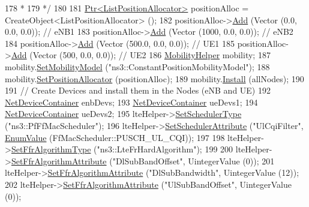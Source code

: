\begin{DoxyCode}
178 \textcolor{comment}{   *}
179 \textcolor{comment}{   */}
180 
181   \hyperlink{classns3_1_1Ptr}{Ptr<ListPositionAllocator>} positionAlloc = CreateObject<ListPositionAllocator> 
      ();
182   positionAlloc->\hyperlink{classns3_1_1ListPositionAllocator_a460e82f015ac012a73ba0ea0cccb3486}{Add} (Vector (0.0, 0.0, 0.0));   \textcolor{comment}{// eNB1}
183   positionAlloc->\hyperlink{classns3_1_1ListPositionAllocator_a460e82f015ac012a73ba0ea0cccb3486}{Add} (Vector (1000, 0.0, 0.0)); \textcolor{comment}{// eNB2}
184   positionAlloc->\hyperlink{classns3_1_1ListPositionAllocator_a460e82f015ac012a73ba0ea0cccb3486}{Add} (Vector (500.0, 0.0, 0.0));  \textcolor{comment}{// UE1}
185   positionAlloc->\hyperlink{classns3_1_1ListPositionAllocator_a460e82f015ac012a73ba0ea0cccb3486}{Add} (Vector (500, 0.0, 0.0));  \textcolor{comment}{// UE2}
186   \hyperlink{classns3_1_1MobilityHelper}{MobilityHelper} mobility;
187   mobility.\hyperlink{classns3_1_1MobilityHelper_a030275011b6f40682e70534d30280aba}{SetMobilityModel} (\textcolor{stringliteral}{"ns3::ConstantPositionMobilityModel"});
188   mobility.\hyperlink{classns3_1_1MobilityHelper_ac59d5295076be3cc11021566713a28c5}{SetPositionAllocator} (positionAlloc);
189   mobility.\hyperlink{classns3_1_1MobilityHelper_a07737960ee95c0777109cf2994dd97ae}{Install} (allNodes);
190 
191   \textcolor{comment}{// Create Devices and install them in the Nodes (eNB and UE)}
192   \hyperlink{classns3_1_1NetDeviceContainer}{NetDeviceContainer} enbDevs;
193   \hyperlink{classns3_1_1NetDeviceContainer}{NetDeviceContainer} ueDevs1;
194   \hyperlink{classns3_1_1NetDeviceContainer}{NetDeviceContainer} ueDevs2;
195   lteHelper->\hyperlink{classns3_1_1LteHelper_a8f86e55b8b80a81732c4b2df00fb25d5}{SetSchedulerType} (\textcolor{stringliteral}{"ns3::PfFfMacScheduler"});
196   lteHelper->\hyperlink{classns3_1_1LteHelper_a38f8c7f4592b31c0f3dedb53e7909742}{SetSchedulerAttribute} (\textcolor{stringliteral}{"UlCqiFilter"}, 
      \hyperlink{classns3_1_1EnumValue}{EnumValue} (FfMacScheduler::PUSCH\_UL\_CQI));
197 
198   lteHelper->\hyperlink{classns3_1_1LteHelper_a035c6b03305c1511975362f80425b5fc}{SetFfrAlgorithmType} (\textcolor{stringliteral}{"ns3::LteFrHardAlgorithm"});
199 
200   lteHelper->\hyperlink{classns3_1_1LteHelper_a793d56e843a844428851e90752c5f130}{SetFfrAlgorithmAttribute} (\textcolor{stringliteral}{"DlSubBandOffset"}, UintegerValue (0));
201   lteHelper->\hyperlink{classns3_1_1LteHelper_a793d56e843a844428851e90752c5f130}{SetFfrAlgorithmAttribute} (\textcolor{stringliteral}{"DlSubBandwidth"}, UintegerValue (12));
202   lteHelper->\hyperlink{classns3_1_1LteHelper_a793d56e843a844428851e90752c5f130}{SetFfrAlgorithmAttribute} (\textcolor{stringliteral}{"UlSubBandOffset"}, UintegerValue (0));

\end{DoxyCode}

